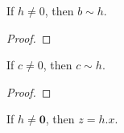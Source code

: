 \begin{thm}
    If $h \ne 0$, then $b \sim h$.
\end{thm}

\begin{proof}
\end{proof}

\begin{thm}
    If $c \ne 0$, then $c \sim h$.
\end{thm}

\begin{proof}
\end{proof}

\begin{thm}
    If $h \ne \textbf{0}$, then $z = h.x$.
\end{thm}

